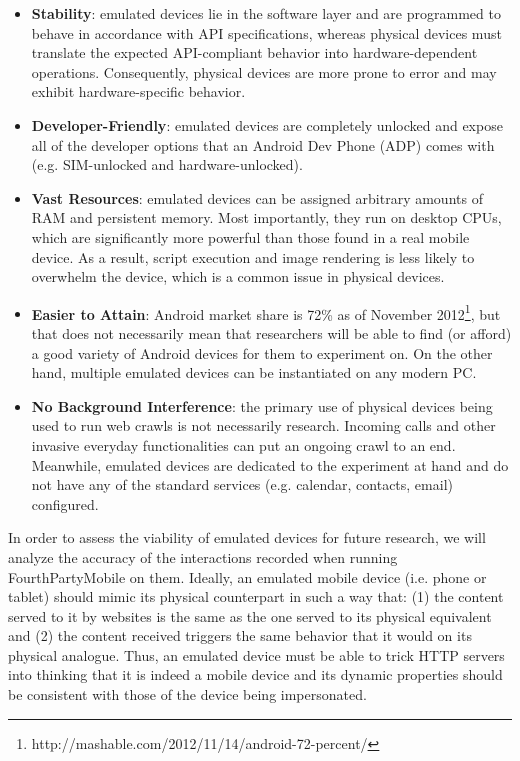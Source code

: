 \documentclass{acm_proc_article-sp}
\begin{document}
\begin{itemize}
\item \textbf{Stability}: emulated devices lie in the software layer and are programmed to behave in accordance with API specifications, whereas physical devices must translate the expected API-compliant behavior into hardware-dependent operations. Consequently, physical devices are more prone to error and may exhibit hardware-specific behavior.

\item \textbf{Developer-Friendly}: emulated devices are completely unlocked and expose all of the developer options that an Android Dev Phone (ADP) comes with (e.g. SIM-unlocked and hardware-unlocked).

\item \textbf{Vast Resources}: emulated devices can be assigned arbitrary amounts of RAM and persistent memory. Most importantly, they run on desktop CPUs, which are significantly more powerful than those found in a real mobile device. As a result, script execution and image rendering is less likely to overwhelm the device, which is a common issue in physical devices.

\item \textbf{Easier to Attain}: Android market share is 72\% as of November 2012\footnote{http://mashable.com/2012/11/14/android-72-percent/}, but that does not necessarily mean that researchers will be able to find (or afford) a good variety of Android devices for them to experiment on. On the other hand, multiple emulated devices can be instantiated on any modern PC.

\item \textbf{No Background Interference}: the primary use of physical devices being used to run web crawls is not necessarily research. Incoming calls and other invasive everyday functionalities can put an ongoing crawl to an end. Meanwhile, emulated devices are dedicated to the experiment at hand and do not have any of the standard services (e.g. calendar, contacts, email) configured.
\end{itemize} 

In order to assess the viability of emulated devices for future research, we will analyze the accuracy of the interactions recorded when running FourthPartyMobile on them. Ideally, an emulated mobile device (i.e. phone or tablet) should mimic its physical counterpart in such a way that: (1) the content served to it by websites is the same as the one served to its physical equivalent and (2) the content received triggers the same behavior that it would on its physical analogue. Thus, an emulated device must be able to trick HTTP servers into thinking that it is indeed a mobile device and its dynamic properties should be consistent with those of the device being impersonated.
\end{document}
